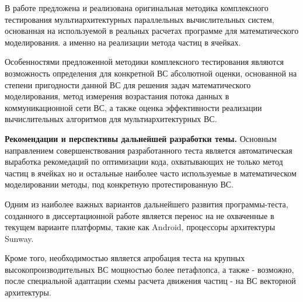  В работе предложена и реализована оригинальная методика комплексного тестирования мультиархитектурных параллельных вычислительных систем, основанная на используемой в реальных расчетах программе для математического моделирования. а именно на реализации метода частиц в ячейках.
 
 Особенностями предложенной методики комплексного тестирования являются возможность определения для конкретной ВС абсолютной оценки, основанной на степени пригодности данной ВС для решения задач математического моделирования, метод измерения возрастания потока данных в коммуникационной сети ВС, а также оценка эффективности реализации вычислительных алгоритмов для мультиархитектурных ВС.
 
 \textbf{Рекомендации и перспективы дальнейшей разработки темы.}
 Основным направлением совершенствования разработанного теста является автоматическая выработка рекомедаций по оптимизации кода, охватывающих не только метод частиц в ячейках но и остальные наиболее часто используемые в математическом моделировании методы,  под конкретную протестированную ВС.
 
 Одним из наиболее важных вариантов дальнейшего развития программы-теста, созданного в диссертационной работе является перенос на не охваченные в текущем варианте платформы, такие как Android, процессоры архитектуры Sunway.
 
 Кроме того, необходимостью является апробация теста на крупных высокопроизводительных ВС мощностью более петафлопса, а также - возможно, после специальной адаптации схемы расчета движения частиц - на ВС векторной архитектуры.
 
 
 
 
 
  
 
 
